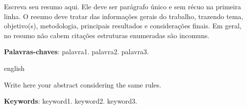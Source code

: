 \setlength{\absparsep}{18pt} %
\begin{resumo}

Escreva seu resumo aqui. Ele deve ser parágrafo único e sem récuo na primeira linha. O resumo deve tratar das informações gerais do trabalho, trazendo tema, objetivo(s), metodologia, principais resultados e considerações finais. Em geral, no resumo não cabem citações estruturas enumeradas são incomuns.
 
 
 \noindent
 \textbf{Palavras-chaves}: palavra1. palavra2. palavra3. 
\end{resumo}
\begin{resumo}[Abstract]
	\begin{otherlanguage*}{english}
	
	Write here your abstract considering the same rules.
	\lipsum[1-1]
	
	\vspace{\onelineskip}
	\noindent 
	\textbf{Keywords}: keyword1. keyword2. keyword3.
	\end{otherlanguage*}
\end{resumo}